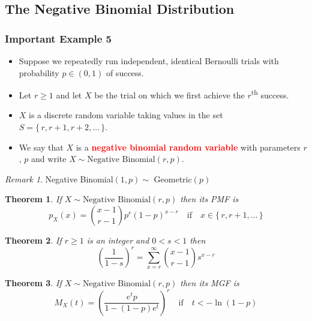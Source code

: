 \documentclass{article}
\newcommand{\bfred}[1]{\textcolor{red}{\textbf{#1}}}
\theoremstyle{plain}
\newtheorem{thm}{Theorem}[section]
\theoremstyle{definition}
\theoremstyle{remark}
\newtheorem*{rem}{Remark}
\begin{document}
\subsection{The Negative Binomial Distribution}

\subsubsection*{Important Example 5}

\begin{tcolorbox}[title = Negative Binomial Distribution, colback = SkyBlue!5!white,colframe = SkyBlue!75!black]
    \begin{itemize}
        \item Suppose we repeatedly run independent, identical Bernoulli trials with probability $p \in (0,1)$ of success.
        \item Let $r \geq 1$ and let $X$ be the trial on which we first achieve the $r$\textsuperscript{th} success.
        \item $X$ is a discrete random variable taking values in the set $S=\{\,r,r+1,r+2,\dotsc\,\}$.
        \item We say that $X$ is a \bfred{negative binomial random variable} with parameters $r$, $p$ and write $X \sim \text{Negative Binomial}(r,p)$.
    \end{itemize}
\end{tcolorbox}

\begin{rem}
    Negative Binomial$(1,p) \sim$ Geometric$(p)$
\end{rem}

\begin{thm}
    If $X \sim \text{Negative Binomial}(r,p)$ then its PMF is \[p_X(x)=\binom{x-1}{r-1}p^r(1-p)^{x-r} \quad \text{if} \quad x \in \{\,r,r+1,\dotsc\,\}\]
\end{thm}

\begin{thm}
    If $r\geq1$ is an integer and $0<s<1$ then \[\left(\frac{1}{1-s}\right)^r = \sum_{x=r}^\infty\binom{x-1}{r-1}s^{x-r}\]
\end{thm}

\begin{thm}
    If $X \sim \text{Negative Binomial}(r,p)$ then its MGF is \[M_X(t) = \left(\frac{e^tp}{1-(1-p)e^t}\right)^r \quad \text{if} \quad t<-\ln(1-p)\]
\end{thm}
\end{document}
